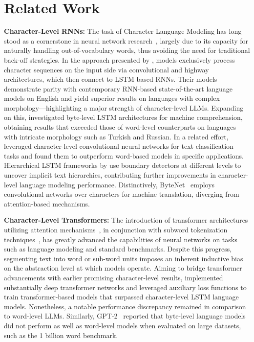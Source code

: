 \section{Related Work}
\label{section:related_work}

\textbf{Character-Level RNNs:} The task of Character Language Modeling has long stood as a cornerstone in neural network research~\citep{sutskever2011generating,mikolov2012subword,graves2013generating}, largely due to its capacity for naturally handling out-of-vocabulary words, thus avoiding the need for traditional back-off strategies. In the approach presented by \cite{kim2016character}, models exclusively process character sequences on the input side via convolutional and highway architectures, which then connect to LSTM-based RNNs. Their models demonstrate parity with contemporary RNN-based state-of-the-art language models on English and yield superior results on languages with complex morphology—highlighting a major strength of character-level LLMs. Expanding on this, \cite{kenter2018byte} investigated byte-level LSTM architectures for machine comprehension, obtaining results that exceeded those of word-level counterparts on languages with intricate morphology such as Turkish and Russian. In a related effort, \cite{zhang2015character} leveraged character-level convolutional neural networks for text classification tasks and found them to outperform word-based models in specific applications. Hierarchical LSTM frameworks by \citet{chung2019hierarchical} use boundary detectors at different levels to uncover implicit text hierarchies, contributing further improvements in character-level language modeling performance. Distinctively, ByteNet~\citep{kalchbrenner2016neural} employs convolutional networks over characters for machine translation, diverging from attention-based mechanisms.

\textbf{Character-Level Transformers:} The introduction of transformer architectures utilizing attention mechanisms~\citep{vaswani2017attention}, in conjunction with subword tokenization techniques~\citep{sennrich-etal-2016-neural}, has greatly advanced the capabilities of neural networks on tasks such as language modeling and standard benchmarks. Despite this progress, segmenting text into word or sub-word units imposes an inherent inductive bias on the abstraction level at which models operate. Aiming to bridge transformer advancements with earlier promising character-level results, \citet{al2019character} implemented substantially deep transformer networks and leveraged auxiliary loss functions to train transformer-based models that surpassed character-level LSTM language models. Nonetheless, a notable performance discrepancy remained in comparison to word-level LLMs. Similarly, GPT-2~\citep{radfordgpt2} reported that byte-level language models did not perform as well as word-level models when evaluated on large datasets, such as the 1 billion word benchmark.

